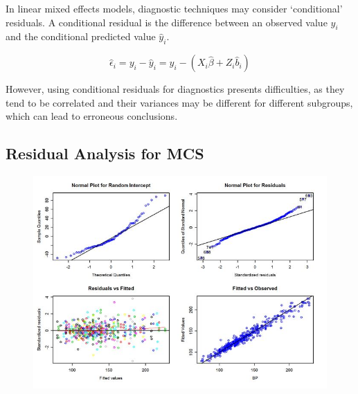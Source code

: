 \documentclass[Main.tex]{subfiles}
\begin{document}




In linear mixed effects models, diagnostic techniques may consider `conditional' residuals. A conditional residual is the difference between an observed value $y_{i}$ and the conditional predicted value $\hat{y}_{i} $.

\[ \hat{\epsilon}_{i} = y_{i} - \hat{y}_{i} = y_{i} - ( X_{i}\hat{\beta} + Z_{i}\hat{b}_{i}) \]

However, using conditional residuals for diagnostics presents difficulties, as they tend to be correlated and their variances may be different for different subgroups, which can lead to erroneous conclusions.
\newpage
\subsection{Residual Analysis for MCS}

\begin{figure}[h!]
\centering
\includegraphics[width=0.9\linewidth]{ResidPlot}
\caption{}
\label{fig:ResidPlot}
\end{figure}

\newpage
\end{document}

